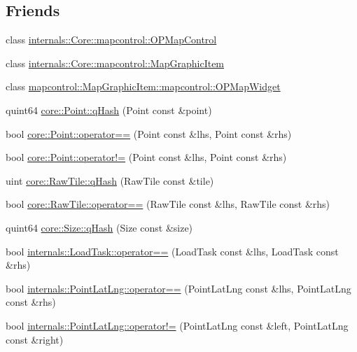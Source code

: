 \subsection*{\-Friends}
\begin{DoxyCompactItemize}
\item 
class \hyperlink{group___o_p_map_widget_ga88abf786b489e97fc16ff6c07da3626e}{internals\-::\-Core\-::mapcontrol\-::\-O\-P\-Map\-Control}
\item 
class \hyperlink{group___o_p_map_widget_ga4fb537bcd209fc77cf5b8c9e38360c07}{internals\-::\-Core\-::mapcontrol\-::\-Map\-Graphic\-Item}
\item 
class \hyperlink{group___o_p_map_widget_gaab6f3be35d4d41ee35530f402954d903}{mapcontrol\-::\-Map\-Graphic\-Item\-::mapcontrol\-::\-O\-P\-Map\-Widget}
\item 
quint64 \hyperlink{group___o_p_map_widget_ga8feadb5b08ae788a3b3149c500a8577c}{core\-::\-Point\-::q\-Hash} (\-Point const \&point)
\item 
bool \hyperlink{group___o_p_map_widget_gad4a997c3713478cec06dca233eeefdba}{core\-::\-Point\-::operator==} (\-Point const \&lhs, \-Point const \&rhs)
\item 
bool \hyperlink{group___o_p_map_widget_ga5f23d9a5e9c27a7fb6560e248ba8950e}{core\-::\-Point\-::operator!=} (\-Point const \&lhs, \-Point const \&rhs)
\item 
uint \hyperlink{group___o_p_map_widget_ga7b7411b1b50d2977c787264eb948910a}{core\-::\-Raw\-Tile\-::q\-Hash} (\-Raw\-Tile const \&tile)
\item 
bool \hyperlink{group___o_p_map_widget_ga7b53343b44511baed2e1587fdd5c88aa}{core\-::\-Raw\-Tile\-::operator==} (\-Raw\-Tile const \&lhs, \-Raw\-Tile const \&rhs)
\item 
quint64 \hyperlink{group___o_p_map_widget_ga49c2077e2f80e6178a3dfbda52f03e88}{core\-::\-Size\-::q\-Hash} (\-Size const \&size)
\item 
bool \hyperlink{group___o_p_map_widget_ga6780adf9ff8340f912353a6ef6e68751}{internals\-::\-Load\-Task\-::operator==} (\-Load\-Task const \&lhs, \-Load\-Task const \&rhs)
\item 
bool \hyperlink{group___o_p_map_widget_ga9265718a15e315e6d89a008c945393b3}{internals\-::\-Point\-Lat\-Lng\-::operator==} (\-Point\-Lat\-Lng const \&lhs, \-Point\-Lat\-Lng const \&rhs)
\item 
bool \hyperlink{group___o_p_map_widget_gab7da08dc85e294bae6bc1e2aed690d7f}{internals\-::\-Point\-Lat\-Lng\-::operator!=} (\-Point\-Lat\-Lng const \&left, \-Point\-Lat\-Lng const \&right)

\end{DoxyCompactItemize}
